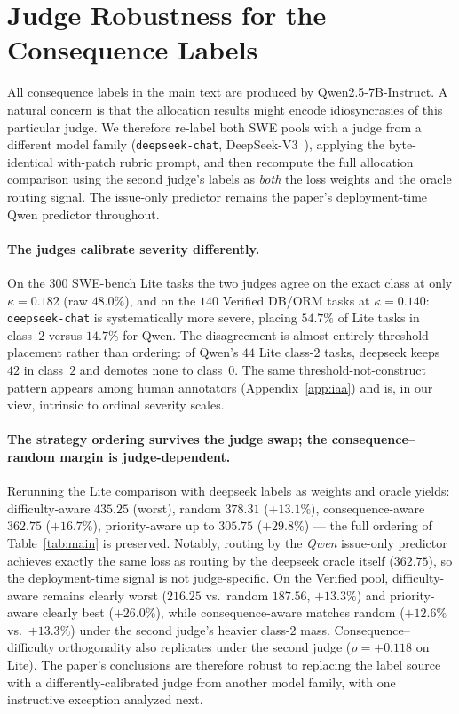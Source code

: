 \documentclass{article}
\begin{document}
\section{Judge Robustness for the Consequence Labels}
\label{app:judge2}

All consequence labels in the main text are produced by
Qwen2.5-7B-Instruct. A natural concern is that the allocation results
might encode idiosyncrasies of this particular judge. We therefore
re-label both SWE pools with a judge from a different model family
(\texttt{deepseek-chat}, DeepSeek-V3~\citep{deepseekai2024v3}),
applying the byte-identical with-patch
rubric prompt, and then recompute the full allocation comparison
using the second judge's labels as \emph{both} the loss weights and
the oracle routing signal. The issue-only predictor remains the
paper's deployment-time Qwen predictor throughout.

\paragraph{The judges calibrate severity differently.} On the $300$
SWE-bench Lite tasks the two judges agree on the exact class at only
$\kappa = 0.182$ (raw $48.0\%$), and on the $140$ Verified DB/ORM
tasks at $\kappa = 0.140$: \texttt{deepseek-chat} is systematically
more severe, placing $54.7\%$ of Lite tasks in class~$2$ versus
$14.7\%$ for Qwen. The disagreement is almost entirely threshold
placement rather than ordering: of Qwen's $44$ Lite class-$2$ tasks,
deepseek keeps $42$ in class~$2$ and demotes none to class~$0$. The
same threshold-not-construct pattern appears among human annotators
(Appendix~\ref{app:iaa}) and is, in our view, intrinsic to ordinal
severity scales.

\paragraph{The strategy ordering survives the judge swap; the
consequence--random margin is judge-dependent.}
Rerunning the Lite comparison with deepseek labels as weights and
oracle yields: difficulty-aware $435.25$ (worst), random $378.31$
($+13.1\%$), consequence-aware $362.75$ ($+16.7\%$), priority-aware
up to $305.75$ ($+29.8\%$) --- the full ordering of
Table~\ref{tab:main} is preserved. Notably, routing by the
\emph{Qwen} issue-only predictor achieves exactly the same loss as
routing by the deepseek oracle itself ($362.75$), so the
deployment-time signal is not judge-specific. On the Verified pool,
difficulty-aware remains clearly worst ($216.25$ vs.\ random
$187.56$, $+13.3\%$) and priority-aware clearly best ($+26.0\%$),
while consequence-aware matches random ($+12.6\%$ vs.\ $+13.3\%$)
under the second judge's heavier class-$2$ mass. Consequence--difficulty
orthogonality also replicates under the second judge
($\rho = +0.118$ on Lite). The paper's conclusions are therefore
robust to replacing the label source with a differently-calibrated
judge from another model family, with one instructive exception
analyzed next.
\end{document}
